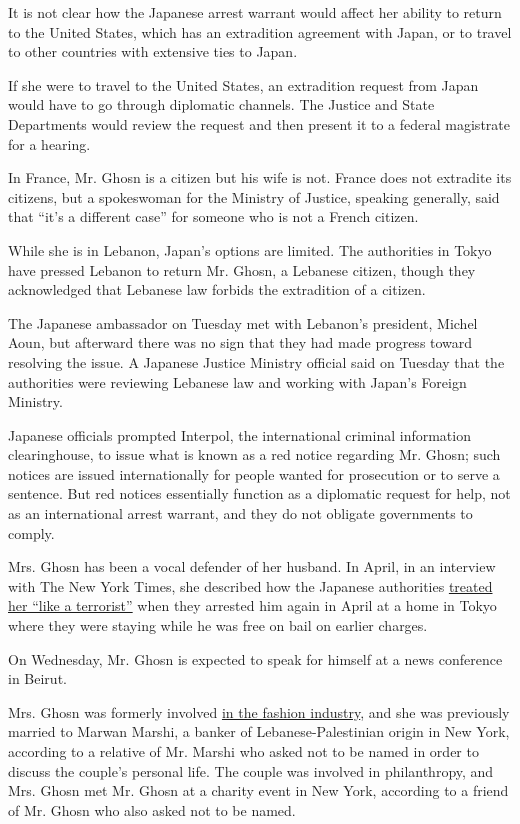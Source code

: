 It is not clear how the Japanese arrest warrant would affect her ability
to return to the United States, which has an extradition agreement with
Japan, or to travel to other countries with extensive ties to Japan.

If she were to travel to the United States, an extradition request from
Japan would have to go through diplomatic channels. The Justice and
State Departments would review the request and then present it to a
federal magistrate for a hearing.

In France, Mr. Ghosn is a citizen but his wife is not. France does not
extradite its citizens, but a spokeswoman for the Ministry of Justice,
speaking generally, said that ``it's a different case'' for someone who
is not a French citizen.

While she is in Lebanon, Japan's options are limited. The authorities in
Tokyo have pressed Lebanon to return Mr. Ghosn, a Lebanese citizen,
though they acknowledged that Lebanese law forbids the extradition of a
citizen.

The Japanese ambassador on Tuesday met with Lebanon's president, Michel
Aoun, but afterward there was no sign that they had made progress toward
resolving the issue. A Japanese Justice Ministry official said on
Tuesday that the authorities were reviewing Lebanese law and working
with Japan's Foreign Ministry.

Japanese officials prompted Interpol, the international criminal
information clearinghouse, to issue what is known as a red notice
regarding Mr. Ghosn; such notices are issued internationally for people
wanted for prosecution or to serve a sentence. But red notices
essentially function as a diplomatic request for help, not as an
international arrest warrant, and they do not obligate governments to
comply.

Mrs. Ghosn has been a vocal defender of her husband. In April, in an
interview with The New York Times, she described how the Japanese
authorities
\href{https://www.nytimes.com/2019/04/04/business/carlos-ghosn-carole-wife-japan-nissan-arrest.html}{treated
her ``like a terrorist''} when they arrested him again in April at a
home in Tokyo where they were staying while he was free on bail on
earlier charges.

On Wednesday, Mr. Ghosn is expected to speak for himself at a news
conference in Beirut.

Mrs. Ghosn was formerly involved
\href{https://www.elledecor.com/shopping/home-accessories/a3167/caftans-for-a-cause-a-68942/}{in
the fashion industry}, and she was previously married to Marwan Marshi,
a banker of Lebanese-Palestinian origin in New York, according to a
relative of Mr. Marshi who asked not to be named in order to discuss the
couple's personal life. The couple was involved in philanthropy, and
Mrs. Ghosn met Mr. Ghosn at a charity event in New York, according to a
friend of Mr. Ghosn who also asked not to be named.

